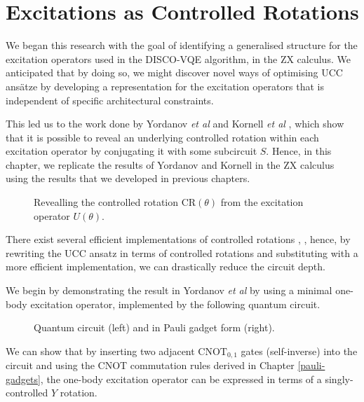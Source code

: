 \section{Excitations as Controlled Rotations}%
\label{operator-controlled-rotations}

We began this research with the goal of identifying a generalised structure for the excitation operators used in the DISCO-VQE algorithm, in the ZX calculus. We anticipated that by doing so, we might discover novel ways of optimising UCC ansätze by developing a representation for the excitation operators that is independent of specific architectural constraints.

This led us to the work done by Yordanov \textit{et al} \cite{Yordanov2020} and Kornell \textit{et al} \cite{Kornell2023}, which show that it is possible to reveal an underlying controlled rotation within each excitation operator by conjugating it with some subcircuit $S$. Hence, in this chapter, we replicate the results of Yordanov and Kornell in the ZX calculus using the results that we developed in previous chapters.

\begin{figure}[H]
    \centering
    \caption{Revealling the controlled rotation CR$(\theta)$ from the excitation operator $U(\theta)$.}
\end{figure}

There exist several efficient implementations of controlled rotations \cite{ZomorodiMoghadam2016}, \cite{Ye2006}, hence, by rewriting the UCC ansatz in terms of controlled rotations and substituting with a more efficient implementation, we can drastically reduce the circuit depth.

We begin by demonstrating the result in Yordanov \textit{et al} by using a minimal one-body excitation operator, implemented by the following quantum circuit.

\begin{figure}[H]
    \centering
    \caption{Quantum circuit (left) and in Pauli gadget form (right).}
    \label{minimal-one-body}
\end{figure}

We can show that by inserting two adjacent $\text{CNOT}_{0, 1}$ gates (self-inverse) into the circuit and using the CNOT commutation rules derived in Chapter \ref{pauli-gadgets}, the one-body excitation operator can be expressed in terms of a singly-controlled $Y$ rotation.

